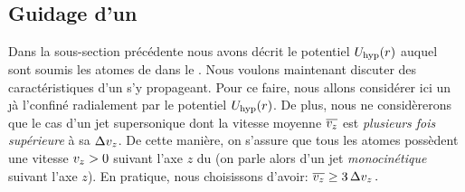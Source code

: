 \casse

	\subsection{Guidage \ma d'un \jatuf}\label{sec:GuidageJet}
	Dans la sous-section précédente nous avons décrit le potentiel ${U_{\rm hyp}}(r)$ auquel sont soumis les atomes de \Rb dans le \gm. Nous voulons maintenant discuter des caractéristiques d'un \jat s'y propageant. Pour ce faire, nous allons considérer ici un \j à l'\eqthdy confiné radialement par le potentiel ${U_{\rm hyp}}(r)$. De plus, nous ne considèrerons que le cas d'un jet supersonique dont la vitesse moyenne ${\overline{v_z}}$ %
%
est \emph{plusieurs fois supérieure} à sa \dispvitlong ${\Delta v_z}$. De cette manière, on s'assure que tous les atomes possèdent une vitesse ${v_{ z}} > 0$ %
	suivant l'axe $z$ du \gm (on parle alors d'un jet \emph{monocinétique} suivant l'axe $z$). En pratique, nous choisissons d'avoir:
$
	{\overline{v_z}} \geq 3\,{\Delta v_z}
	\, .
$
